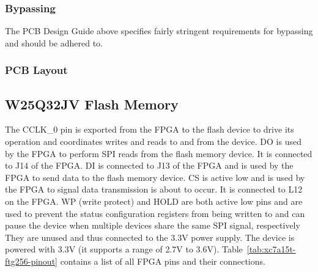 \subsubsection{Bypassing}
\label{sec:xc7a15t-ftg256-bypassing}

The PCB Design Guide above specifies fairly stringent requirements for bypassing and should be
adhered to.

\subsubsection{PCB Layout}
\label{sec:xc7a15t-ftg256-pcb}



\subsection{W25Q32JV Flash Memory}
\label{sec:w25q32jv}

The CCLK\_0 pin is exported from the FPGA to the flash device to drive its operation and coordinates
writes and reads to and from the device. DO is used by the FPGA to perform SPI reads from the flash
memory device. It is connected to J14 of the FPGA\@. DI is connected to J13 of the FPGA and is used
by the FPGA to send data to the flash memory device. CS is active low and is used by the FPGA to
signal data transmission is about to occur. It is connected to L12 on the FPGA\@. WP (write protect)
and HOLD are both active low pins and are used to prevent the status configuration registers from
being written to and can pause the device when multiple devices share the same SPI signal,
respectively They are unused and thus connected to the 3.3V power supply. The device is powered with
3.3V (it supports a range of 2.7V to 3.6V). Table~\ref{tab:xc7a15t-ftg256-pinout} contains a list of all FPGA
pins and their connections.

